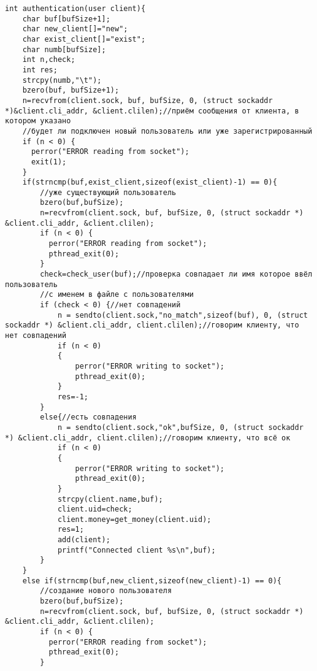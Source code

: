 \documentclass[12pt,a4paper]{report}
\begin{document}
\begin{lstlisting}
int authentication(user client){
    char buf[bufSize+1];
    char new_client[]="new";
    char exist_client[]="exist";
    char numb[bufSize];
    int n,check;
    int res;
    strcpy(numb,"\t");
    bzero(buf, bufSize+1);
    n=recvfrom(client.sock, buf, bufSize, 0, (struct sockaddr *)&client.cli_addr, &client.clilen);//приём сообщения от клиента, в котором указано
    //будет ли подключен новый пользователь или уже зарегистрированный
    if (n < 0) {
      perror("ERROR reading from socket");
      exit(1);
    }
    if(strncmp(buf,exist_client,sizeof(exist_client)-1) == 0){
        //уже существующий пользователь
        bzero(buf,bufSize);
        n=recvfrom(client.sock, buf, bufSize, 0, (struct sockaddr *) &client.cli_addr, &client.clilen);
        if (n < 0) {
          perror("ERROR reading from socket");
          pthread_exit(0);
        }
        check=check_user(buf);//проверка совпадает ли имя которое ввёл пользователь
        //с именем в файле с пользователями
        if (check < 0) {//нет совпадений
            n = sendto(client.sock,"no_match",sizeof(buf), 0, (struct sockaddr *) &client.cli_addr, client.clilen);//говорим клиенту, что нет совпадений
            if (n < 0)
            {
                perror("ERROR writing to socket");
                pthread_exit(0);
            }
            res=-1;
        }
        else{//есть совпадения
            n = sendto(client.sock,"ok",bufSize, 0, (struct sockaddr *) &client.cli_addr, client.clilen);//говорим клиенту, что всё ок
            if (n < 0)
            {
                perror("ERROR writing to socket");
                pthread_exit(0);
            }          
            strcpy(client.name,buf);
            client.uid=check;
            client.money=get_money(client.uid);
            res=1;
            add(client);
            printf("Connected client %s\n",buf);
        }
    }
    else if(strncmp(buf,new_client,sizeof(new_client)-1) == 0){
        //создание нового пользователя
        bzero(buf,bufSize);
        n=recvfrom(client.sock, buf, bufSize, 0, (struct sockaddr *) &client.cli_addr, &client.clilen);
        if (n < 0) {
          perror("ERROR reading from socket");
          pthread_exit(0);
        }


\end{lstlisting}
\end{document}
